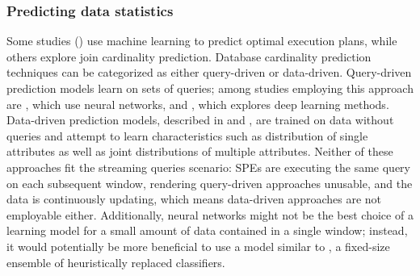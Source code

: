 \subsubsection*{Predicting data statistics}
Some studies (\cite{krishnan2018learning, marcus2019neo}) use machine learning to predict optimal execution plans, while others explore join cardinality prediction. Database cardinality prediction techniques can be categorized as either query-driven or data-driven. Query-driven prediction models learn on sets of queries; among studies employing this approach are \cite{liu2015cardinality, CHEN20211047, kipf2018learned}, which use neural networks, and \cite{ortiz2019empirical}, which explores deep learning methods. Data-driven prediction models, described in \cite{hilprecht2020deepdb} and \cite{yang2020neurocard}, are trained on data without queries and attempt to learn characteristics such as distribution of single attributes as well as joint distributions of multiple attributes. Neither of these approaches fit the streaming queries scenario: SPEs are executing the same query on each subsequent window, rendering query-driven approaches unusable, and the data is continuously updating, which means data-driven approaches are not employable either. Additionally, neural networks might not be the best choice of a learning model for a small amount of data contained in a single window; instead, it would potentially be more beneficial to use a model similar to \cite{street2001ensemble}, a fixed-size ensemble of heuristically replaced classifiers.










